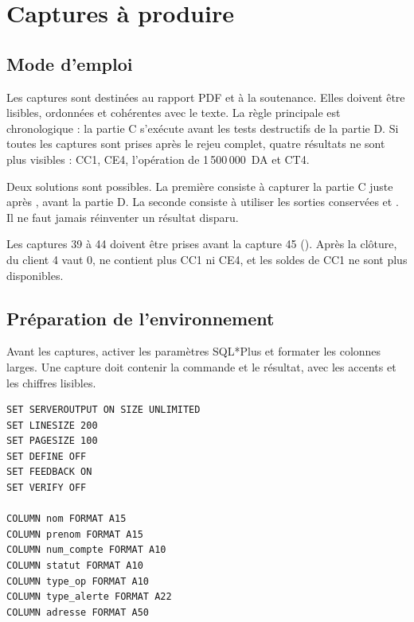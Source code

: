 \chapter{Captures à produire}
\label{ann:captures}

\section{Mode d'emploi}

Les captures sont destinées au rapport PDF et à la soutenance. Elles doivent
être lisibles, ordonnées et cohérentes avec le texte. La règle principale est
chronologique : la partie C s'exécute avant les tests destructifs de la partie
D. Si toutes les captures sont prises après le rejeu complet, quatre résultats
ne sont plus visibles : CC1, CE4, l'opération de 1\,500\,000~DA et CT4.

Deux solutions sont possibles. La première consiste à capturer la partie C
juste après , avant la partie D. La
seconde consiste à utiliser les sorties conservées
 et
. Il ne faut jamais réinventer un
résultat disparu.

\begin{attentionbox}
Les captures 39 à 44 doivent être prises avant la capture 45
(). Après la clôture,  du client 4 vaut 0,
 ne contient plus CC1 ni CE4, et les soldes de CC1 ne sont
plus disponibles.
\end{attentionbox}

\section{Préparation de l'environnement}

Avant les captures, activer les paramètres SQL*Plus et formater les colonnes
larges. Une capture doit contenir la commande et le résultat, avec les accents
et les chiffres lisibles.

\begin{lstlisting}[caption={Paramètres de capture dans SQL*Plus.},label={lst:captures-param}]
SET SERVEROUTPUT ON SIZE UNLIMITED
SET LINESIZE 200
SET PAGESIZE 100
SET DEFINE OFF
SET FEEDBACK ON
SET VERIFY OFF

COLUMN nom FORMAT A15
COLUMN prenom FORMAT A15
COLUMN num_compte FORMAT A10
COLUMN statut FORMAT A10
COLUMN type_op FORMAT A10
COLUMN type_alerte FORMAT A22
COLUMN adresse FORMAT A50
\end{lstlisting}

